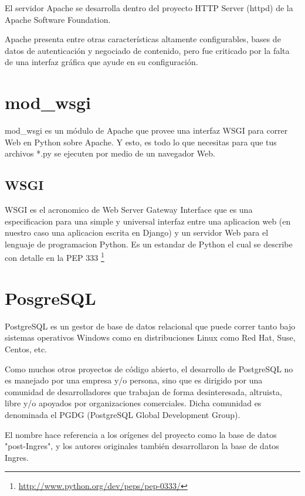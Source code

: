 El servidor Apache se desarrolla dentro del proyecto HTTP Server (httpd) de la
Apache Software Foundation.

Apache presenta entre otras características altamente configurables, bases de
datos de autenticación y negociado de contenido, pero fue criticado por la falta
de una interfaz gráfica que ayude en su configuración.\\[0.2cm]

\section{mod\_wsgi}

mod\_wsgi es un módulo de Apache que provee una interfaz WSGI para correr
 Web en Python sobre Apache. Y esto, es todo lo que necesitas para que tus
 archivos *.py se ejecuten por medio de un navegador Web.

\subsection{WSGI}

WSGI es el acronomico de Web Server Gateway Interface que es una especificacion
para una simple y universal interfaz entre una aplicacion web (en nuestro caso
una aplicacion escrita en Django) y un servidor Web para el lenguaje de programacion
Python. Es un estandar de Python el cual se describe con detalle en la PEP 333
\footnote{\url{http://www.python.org/dev/peps/pep-0333/}}



\section{PosgreSQL}

PostgreSQL es un gestor de base de datos relacional que puede correr tanto bajo
sistemas operativos Windows como en distribuciones Linux como Red Hat, Suse,
Centos, etc.

Como muchos otros proyectos de código abierto, el desarrollo de PostgreSQL
no es manejado por una empresa y/o persona, sino que es dirigido por una comunidad
de desarrolladores que trabajan de forma desinteresada, altruista, libre y/o
apoyados por organizaciones comerciales. Dicha comunidad es denominada
el PGDG (PostgreSQL Global Development Group).

El nombre hace referencia a los orígenes del proyecto como la base de datos
"post-Ingres", y los autores originales también desarrollaron la base de datos Ingres.

